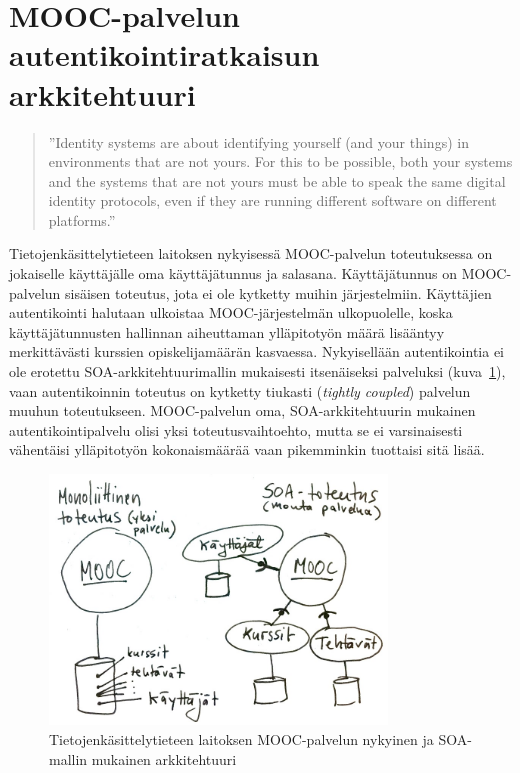 \documentclass[finnish,gradu]{tktltiki}
\begin{document}






\section{MOOC-palvelun autentikointiratkaisun arkkitehtuuri} %
\label{sec:mooc_palvelun_autentikointiratkaisun_arkkitehtuuri}

  \begin{quote}
    ''Identity systems are about identifying yourself (and your things) in environments that are not yours.
    For this to be possible, both your systems and the systems that are not yours
    must be able to speak the same digital identity protocols,
    even if they are running different software on different platforms.''~\cite{cameron_id_arch_2006}
  \end{quote}

  Tietojenkäsittelytieteen laitoksen nykyisessä MOOC-palvelun toteutuksessa on jokaiselle käyttäjälle oma käyttäjätunnus ja salasana. Käyttäjätunnus on MOOC-palvelun sisäisen toteutus, jota ei ole kytketty muihin järjestelmiin. Käyttäjien autentikointi halutaan ulkoistaa MOOC-järjestelmän ulkopuolelle, koska käyttäjätunnusten hallinnan aiheuttaman ylläpitotyön määrä lisääntyy merkittävästi kurssien opiskelijamäärän kasvaessa. Nykyisellään autentikointia ei ole erotettu SOA-arkkitehtuurimallin mukaisesti itsenäiseksi palveluksi (kuva~\ref{fig:mooc-arkkitehtuuri}), vaan autentikoinnin toteutus on kytketty tiukasti (\emph{tightly coupled}) palvelun muuhun toteutukseen. MOOC-palvelun oma, SOA-arkkitehtuurin mukainen autentikointipalvelu olisi yksi toteutusvaihtoehto, mutta se ei varsinaisesti vähentäisi ylläpitotyön kokonaismäärää vaan pikemminkin tuottaisi sitä lisää.

  \begin{figure}[h!]
    \centering
    \includegraphics[width=0.8\textwidth]{images/mooc-arkkitehtuuri.jpg}
    \caption{Tietojenkäsittelytieteen laitoksen MOOC-palvelun nykyinen ja SOA-mallin mukainen arkkitehtuuri}
    \label{fig:mooc-arkkitehtuuri}
  \end{figure}
\end{document}
